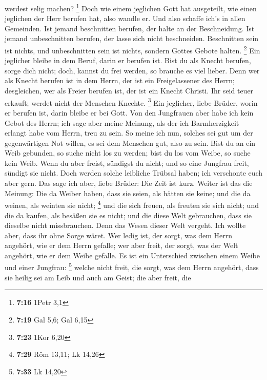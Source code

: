 werdest selig machen? \footnote{\textbf{7:16} 1Petr 3,1} 
Doch wie einem jeglichen Gott hat ausgeteilt, wie einen jeglichen der
Herr berufen hat, also wandle er. Und also schaffe ich's in allen
Gemeinden.  Ist jemand beschnitten berufen, der halte an
der Beschneidung. Ist jemand unbeschnitten berufen, der lasse sich nicht
beschneiden.  Beschnitten sein ist nichts, und
unbeschnitten sein ist nichts, sondern Gottes Gebote halten. \footnote{\textbf{7:19}
  Gal 5,6; Gal 6,15}  Ein jeglicher bleibe in dem Beruf,
darin er berufen ist.  Bist du als Knecht berufen, sorge
dich nicht; doch, kannst du frei werden, so brauche es viel lieber.
 Denn wer als Knecht berufen ist in dem Herrn, der ist
ein Freigelassener des Herrn; desgleichen, wer als Freier berufen ist,
der ist ein Knecht Christi.  Ihr seid teuer erkauft;
werdet nicht der Menschen Knechte. \footnote{\textbf{7:23} 1Kor 6,20}
 Ein jeglicher, liebe Brüder, worin er berufen ist, darin
bleibe er bei Gott.  Von den Jungfrauen aber habe ich
kein Gebot des Herrn; ich sage aber meine Meinung, als der ich
Barmherzigkeit erlangt habe vom Herrn, treu zu sein.  So
meine ich nun, solches sei gut um der gegenwärtigen Not willen, es sei
dem Menschen gut, also zu sein.  Bist du an ein Weib
gebunden, so suche nicht los zu werden; bist du los vom Weibe, so suche
kein Weib.  Wenn du aber freist, sündigst du nicht; und
so eine Jungfrau freit, sündigt sie nicht. Doch werden solche leibliche
Trübsal haben; ich verschonte euch aber gern.  Das sage
ich aber, liebe Brüder: Die Zeit ist kurz. Weiter ist das die Meinung:
Die da Weiber haben, dass sie seien, als hätten sie keine; und die da
weinen, als weinten sie nicht; \footnote{\textbf{7:29} Röm 13,11; Lk
  14,26}  und die sich freuen, als freuten sie sich
nicht; und die da kaufen, als besäßen sie es nicht;  und
die diese Welt gebrauchen, dass sie dieselbe nicht missbrauchen. Denn
das Wesen dieser Welt vergeht.  Ich wollte aber, dass ihr
ohne Sorge wäret. Wer ledig ist, der sorgt, was dem Herrn angehört, wie
er dem Herrn gefalle;  wer aber freit, der sorgt, was der
Welt angehört, wie er dem Weibe gefalle. Es ist ein Unterschied zwischen
einem Weibe und einer Jungfrau: \footnote{\textbf{7:33} Lk 14,20}
 welche nicht freit, die sorgt, was dem Herrn angehört,
dass sie heilig sei am Leib und auch am Geist; die aber freit, die
